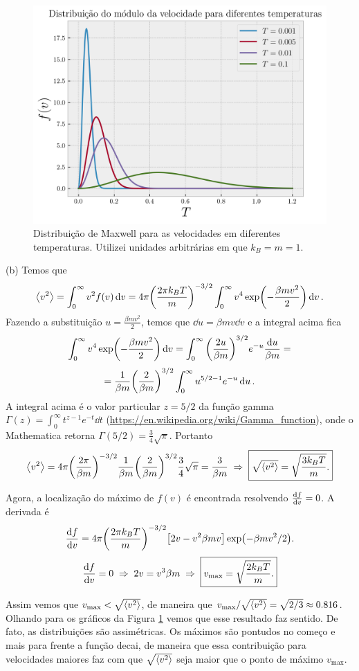 \documentclass[a4paper,10pt]{article}
\begin{document}
\begin{figure}[H]
\centering
\includegraphics[width=0.7\linewidth]{fig/distrib-vel-maxwell.png}
\caption{Distribuição de Maxwell para as velocidades em diferentes temperaturas. Utilizei unidades arbitrárias em que $k_B = m = 1$.}
\label{fig:maxwell}
\end{figure}

(b) Temos que
$$
\ev{v^2} = \int_0^\infty v^2 f(v) \dd{v} = 4\pi \qty(\frac{2\pi k_B T}{m})^{-3/2}
\int_0^\infty v^4 \exp(-\frac{\beta m v^2}{2}) \dd{v}.
$$
Fazendo a substituição $u = \frac{\beta m v^2}{2}$, temos que $\dd{u} = \beta m v \dd{v}$ e a integral acima fica
$$
\int_0^\infty v^4 \exp(-\frac{\beta m v^2}{2}) \dd{v} =
\int_0^\infty \qty(\frac{2u}{\beta m})^{3/2} e^{-u} \frac{\dd{u}}{\beta m} =
$$
$$
= \frac{1}{\beta m} \qty(\frac{2}{\beta m})^{3/2} \int_0^\infty u^{5/2 - 1} e^{-u} \dd{u}.
$$
A integral acima é o valor particular $z = 5/2$ da função gamma $\Gamma(z) = \int_0^\infty t^{z-1} e^{-t} \dd{t}$ (\url{https://en.wikipedia.org/wiki/Gamma_function}), onde o Mathematica retorna $\Gamma(5/2) = \frac{3}{4} \sqrt{\pi}$. Portanto
$$
\ev{v^2} = 4\pi \qty(\frac{2\pi}{\beta m})^{-3/2} \frac{1}{\beta m} \qty(\frac{2}{\beta m})^{3/2} \frac{3}{4} \sqrt{\pi} =
\frac{3}{\beta m} \implies
\boxed{ \sqrt{\ev{v^2}} = \sqrt{\frac{3k_B T}{m}}. }
$$

Agora, a localização do máximo de $f(v)$ é encontrada resolvendo $\dv{f}{v} = 0$. A derivada é
$$
\dv{f}{v} = 4\pi \qty(\frac{2\pi k_B T}{m})^{-3/2}
\qty[
2v - v^2 \beta m v
] \exp(-\beta m v^2/2).
$$
$$
\dv{f}{v} = 0 \; \Rightarrow \; 2v = v^3 \beta m \; \Rightarrow \; \boxed{ v_{\text{max}} = \sqrt{\frac{2 k_B T}{m}}. }
$$

Assim vemos que $v_{\text{max}} < \sqrt{\ev{v^2}}$, de maneira que $v_{\text{max}}/\sqrt{\ev{v^2}} = \sqrt{2/3} \approx 0.816$. Olhando para os gráficos da Figura \ref{fig:maxwell} vemos que esse resultado faz sentido. De fato, as distribuições são assimétricas. Os máximos são pontudos no começo e mais para frente a função decai, de maneira que essa contribuição para velocidades maiores faz com que $\sqrt{\ev{v^2}}$ seja maior que o ponto de máximo $v_{\text{max}}$.
\end{document}
